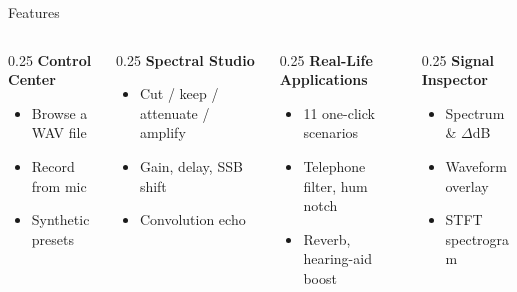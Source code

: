 \begin{frame}{Features}
  \footnotesize
  \begin{columns}[T, totalwidth=\textwidth]
    \begin{column}{0.25\textwidth}
      \textbf{Control Center}
      \begin{itemize}
        \item Browse a WAV file
        \item Record from mic
        \item Synthetic presets
      \end{itemize}
    \end{column}
    \begin{column}{0.25\textwidth}
      \textbf{Spectral Studio}
      \begin{itemize}
        \item Cut / keep / attenuate / amplify
        \item Gain, delay, SSB shift
        \item Convolution echo
      \end{itemize}
    \end{column}
    \begin{column}{0.25\textwidth}
      \textbf{Real-Life Applications}
      \begin{itemize}
        \item 11 one-click scenarios
        \item Telephone filter, hum notch
        \item Reverb, hearing-aid boost
      \end{itemize}
    \end{column}
    \begin{column}{0.25\textwidth}
      \textbf{Signal Inspector}
      \begin{itemize}
        \item Spectrum \& $\Delta$dB
        \item Waveform overlay
        \item STFT spectrogram
      \end{itemize}
    \end{column}
  \end{columns}
  \vspace{0.3cm}
\end{frame}
